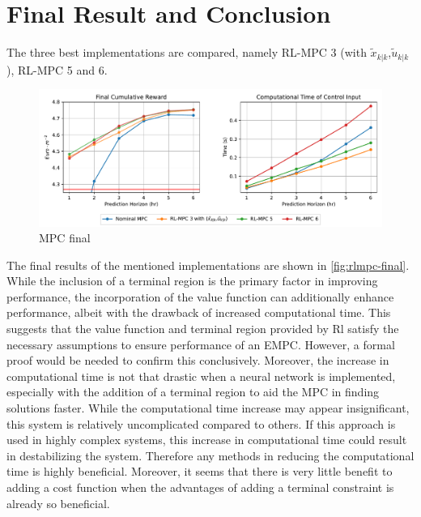 \section{Final Result and Conclusion} \label{section:final-rl-mpc-nominal}
The three best implementations are compared, namely RL-MPC 3 (with $\tilde{x}_{k|k}$,$\tilde{u}_{k|k}$), RL-MPC 5 and 6.
\begin{figure}[H]
	\centering
	\includegraphics[width=\textwidth]{figures/rl_mpc_impl_final.pdf}
	\caption{MPC final }
	\label{fig:rlmpc-final}
\end{figure}

The final results of the mentioned implementations are shown in \autoref{fig:rlmpc-final}. While the inclusion of a terminal region is the primary factor in improving performance, the incorporation of the value function can additionally enhance performance, albeit with the drawback of increased computational time. This suggests that the value function and terminal region provided by Rl satisfy the necessary assumptions to ensure performance of an EMPC. However, a formal proof would be needed to confirm this conclusively. Moreover, the increase in computational time is not that drastic when a neural network is implemented, especially with the addition of a terminal region to aid the MPC in finding solutions faster. While the computational time increase may appear insignificant, this system is relatively uncomplicated compared to others. If this approach is used in highly complex systems, this increase in computational time could result in destabilizing the system. Therefore any methods in reducing the computational time is highly beneficial. Moreover, it seems that there is very little benefit to adding a cost function when the advantages of adding a terminal constraint is already so beneficial.


